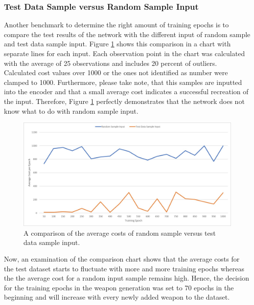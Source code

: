 \documentclass[MGS,Master,english]{twbook}%
\begin{document}
\subsubsection{Test Data Sample versus Random Sample Input}
Another benchmark to determine the right amount of training epochs is to compare the test results of the network with the different input of random sample and test data sample input. Figure \ref{fig::vae::epochsFailureRate} shows this comparison in a chart with separate lines for each input. Each observation point in the chart was calculated with the average of 25 observations and includes 20 percent of outliers. Calculated cost values over 1000 or the ones not identified as number were clamped to 1000. Furthermore, please take note, that this samples are inputted into the encoder and that a small average cost indicates a successful recreation of the input. Therefore, Figure \ref{fig::vae::epochsFailureRate} perfectly demonstrates that the network does not know what to do with random sample input.
\begin{figure}[!ht]
	\centering
	\includegraphics[width=1.0\linewidth]{PICs/trained_vae/epoch_failure_rate}
	\caption{A comparison of the average costs of random sample versus test data sample input.} \label{fig::vae::epochsFailureRate}
\end{figure}

Now, an examination of the comparison chart shows that the average costs for the test dataset starts to fluctuate with more and more training epochs whereas the the average cost for a random input sample remains high. Hence, the decision for the training epochs in the weapon generation was set to 70 epochs in the beginning and will increase with every newly added weapon to the dataset. 
\end{document}
